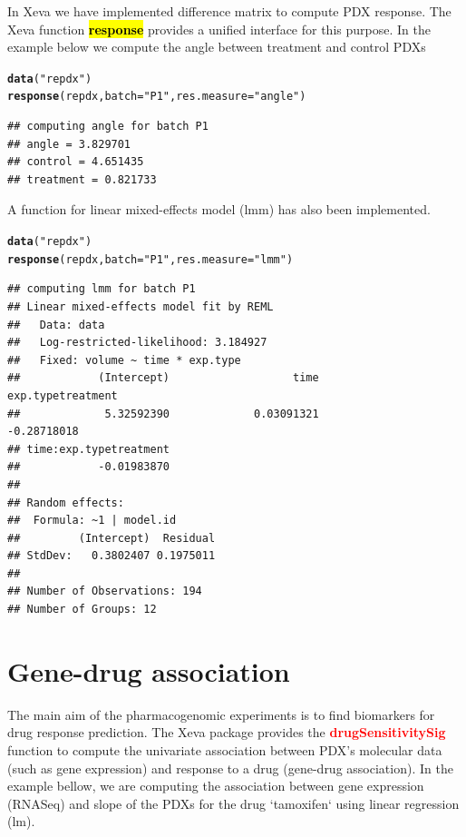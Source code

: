 \documentclass{article}\usepackage[]{graphicx}\usepackage[]{xcolor}
\makeatletter
\newcommand{\hlstr}[1]{\textcolor[rgb]{0.192,0.494,0.8}{#1}}%
\newcommand{\hlstd}[1]{\textcolor[rgb]{0.345,0.345,0.345}{#1}}%
\newcommand{\hlkwc}[1]{\textcolor[rgb]{0.333,0.667,0.333}{#1}}%
\newcommand{\hlkwd}[1]{\textcolor[rgb]{0.737,0.353,0.396}{\textbf{#1}}}%
\newenvironment{kframe}{%
 \def\at@end@of@kframe{}%
 \ifinner\ifhmode%
  \def\at@end@of@kframe{\end{minipage}}%
  \begin{minipage}{\columnwidth}%
 \fi\fi%
 \def\FrameCommand##1{\hskip\@totalleftmargin \hskip-\fboxsep
 \colorbox{shadecolor}{##1}\hskip-\fboxsep
     \hskip-\linewidth \hskip-\@totalleftmargin \hskip\columnwidth}%
 \MakeFramed {\advance\hsize-\width
   \@totalleftmargin\z@ \linewidth\hsize
   \@setminipage}}%
 {\par\unskip\endMakeFramed%
 \at@end@of@kframe}
\newenvironment{knitrout}{}{} %
\makeatother
\begin{document}
In Xeva we have implemented difference matrix to compute PDX response.
The Xeva function \textbf{\textcolor{red}{\hl{response}}} provides a unified interface for this purpose.
In the example below we compute the angle between treatment and control PDXs

\begin{knitrout}
\color{fgcolor}\begin{kframe}
\begin{alltt}
\hlkwd{data}\hlstd{(}\hlstr{"repdx"}\hlstd{)}
\hlkwd{response}\hlstd{(repdx,} \hlkwc{batch}\hlstd{=}\hlstr{"P1"}\hlstd{,} \hlkwc{res.measure}\hlstd{=}\hlstr{"angle"}\hlstd{)}
\end{alltt}
\begin{verbatim}
## computing angle for batch P1
## angle = 3.829701
## control = 4.651435
## treatment = 0.821733
\end{verbatim}
\end{kframe}
\end{knitrout}

A function for linear mixed-effects model (lmm) has also been implemented.
\begin{knitrout}
\color{fgcolor}\begin{kframe}
\begin{alltt}
\hlkwd{data}\hlstd{(}\hlstr{"repdx"}\hlstd{)}
\hlkwd{response}\hlstd{(repdx,} \hlkwc{batch}\hlstd{=}\hlstr{"P1"}\hlstd{,} \hlkwc{res.measure}\hlstd{=}\hlstr{"lmm"}\hlstd{)}
\end{alltt}
\begin{verbatim}
## computing lmm for batch P1
## Linear mixed-effects model fit by REML
##   Data: data 
##   Log-restricted-likelihood: 3.184927
##   Fixed: volume ~ time * exp.type 
##            (Intercept)                   time      exp.typetreatment 
##             5.32592390             0.03091321            -0.28718018 
## time:exp.typetreatment 
##            -0.01983870 
## 
## Random effects:
##  Formula: ~1 | model.id
##         (Intercept)  Residual
## StdDev:   0.3802407 0.1975011
## 
## Number of Observations: 194
## Number of Groups: 12
\end{verbatim}
\end{kframe}
\end{knitrout}



\section{Gene-drug association}
The main aim of the pharmacogenomic experiments is to find biomarkers for drug response prediction.
The Xeva package provides the \textbf{\textcolor{red}{drugSensitivitySig}} function to compute the univariate association between PDX's molecular data (such as gene expression) and response to a drug (gene-drug association). In the example bellow, we are computing the association between gene expression (RNASeq)
and slope of the PDXs for the drug `tamoxifen` using linear regression (lm).
\end{document}
